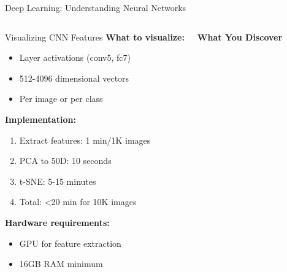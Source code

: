 \documentclass[aspectratio=169]{beamer}
\begin{document}
\begin{frame}{Deep Learning: Understanding Neural Networks}
\begin{columns}
\begin{block}{Visualizing CNN Features}
\textbf{What to visualize:}
\begin{itemize}
\item Layer activations (conv5, fc7)
\item 512-4096 dimensional vectors
\item Per image or per class
\end{itemize}

\textbf{Implementation:}
\footnotesize
\begin{enumerate}
\item Extract features: 1 min/1K images
\item PCA to 50D: 10 seconds
\item t-SNE: 5-15 minutes
\item Total: <20 min for 10K images
\end{enumerate}
\normalsize

\textbf{Hardware requirements:}
\begin{itemize}
\item GPU for feature extraction
\item 16GB RAM minimum
\end{itemize}
\end{block}

\begin{center}
\textbf{What You Discover}\\[3mm]
\end{center}


\end{columns}
\end{frame}
\end{document}
